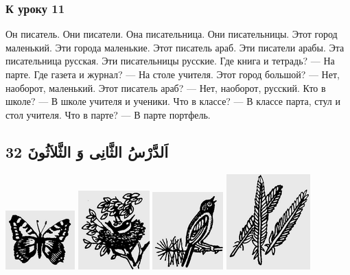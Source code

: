 \documentclass[a5paper]{article}
\begin{document}
\subsubsection{К уроку 11}
Он писатель. Они писатели. Она писательница. Они писательницы. Этот город маленький. Эти города маленькие. Этот писатель араб. Эти писатели арабы. Эта писательница русская. Эти писательницы русские. Где книга и тетрадь? — На парте. Где газета и журнал? — На столе учителя. Этот город большой? — Нет, наоборот, маленький. Этот писатель араб? — Нет, наоборот, русский. Кто в школе? — В школе учителя и ученики. Что в классе? — В классе парта, стул и стол учителя. Что в парте? — В парте портфель.

\subsection[اَلدَّرْسُ الثَّانِى وَ الثَّلاَثُونَ 32]{اَلدَّرْسُ الثَّانِى وَ الثَّلاَثُونَ 32}
 \includegraphics[width=1.052in,height=0.8957in]{MuhammadBagauddinlatinized-img066.png}   \includegraphics[width=1.0835in,height=1.198in]{MuhammadBagauddinlatinized-img067.png}   \includegraphics[width=1.0728in,height=1.1772in]{MuhammadBagauddinlatinized-img068.png}   \includegraphics[width=1.2709in,height=1.448in]{MuhammadBagauddinlatinized-img069.png} 
\end{document}
